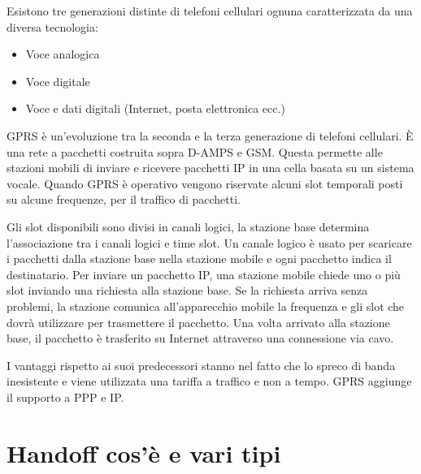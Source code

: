 Esistono tre generazioni distinte di telefoni cellulari ognuna caratterizzata da una diversa tecnologia:
\begin{itemize}
\item	Voce analogica
\item	Voce digitale
\item	Voce e dati digitali (Internet, posta elettronica ecc.)
\end{itemize}
GPRS è un’evoluzione tra la seconda e la terza generazione di telefoni cellulari. È una rete a pacchetti costruita sopra D-AMPS e GSM. Questa permette alle stazioni mobili di inviare e ricevere pacchetti IP in una cella basata su un sistema vocale. Quando GPRS è operativo vengono riservate alcuni slot temporali posti su alcune frequenze, per il traffico di pacchetti.

Gli slot disponibili sono divisi in canali logici, la stazione base determina l’associazione tra i canali logici e time slot. Un canale logico è usato per scaricare i pacchetti dalla stazione base nella stazione mobile e ogni pacchetto indica il destinatario.
Per inviare un pacchetto IP, una stazione mobile chiede uno o più slot inviando una richiesta alla stazione base. Se la richiesta arriva senza problemi, la stazione comunica all’apparecchio mobile la frequenza e gli slot che dovrà utilizzare per trasmettere il pacchetto. Una volta arrivato alla stazione base, il pacchetto è trasferito su Internet attraverso una connessione via cavo.

I vantaggi rispetto ai suoi predecessori stanno nel fatto che lo spreco di banda inesistente e viene utilizzata una tariffa a traffico e non a tempo. GPRS aggiunge il supporto a PPP e IP.

\section{Handoff cos’è e vari tipi}

